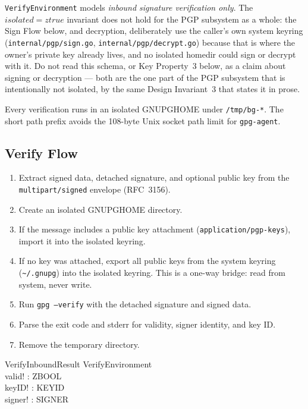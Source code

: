 \documentclass[a4paper,10pt,fleqn]{article}
\begin{document}
\texttt{VerifyEnvironment} models \emph{inbound signature
verification only}.  The $isolated = ztrue$ invariant does not hold
for the PGP subsystem as a whole: the Sign Flow below, and
decryption, deliberately use the caller's own system keyring
(\texttt{internal/pgp/sign.go}, \texttt{internal/pgp/decrypt.go})
because that is
where the owner's private key already lives, and no isolated homedir
could sign or decrypt with it.  Do not read this schema, or Key
Property~3 below, as a claim about signing or decryption --- both
are the one part of the PGP subsystem that is intentionally not
isolated, by the same Design Invariant~3 that states it in prose.

Every verification runs in an isolated GNUPGHOME under
\texttt{/tmp/bg-*}.  The short path prefix avoids the 108-byte
Unix socket path limit for \texttt{gpg-agent}.

\subsection{Verify Flow}

\begin{enumerate}
  \item Extract signed data, detached signature, and optional public
    key from the \texttt{multipart/signed} envelope (RFC~3156).
  \item Create an isolated GNUPGHOME directory.
  \item If the message includes a public key attachment
    (\texttt{application/pgp-keys}), import it into the isolated
    keyring.
  \item If no key was attached, export all public keys from the
    system keyring (\texttt{\~{}/.gnupg}) into the isolated keyring.
    This is a one-way bridge: read from system, never write.
  \item Run \texttt{gpg --verify} with the detached signature and
    signed data.
  \item Parse the exit code and stderr for validity, signer identity,
    and key ID.
  \item Remove the temporary directory.
\end{enumerate}

\begin{schema}{VerifyInboundResult}
  VerifyEnvironment \\
  valid! : ZBOOL \\
  keyID! : KEYID \\
  signer! : SIGNER
\end{schema}
\end{document}

